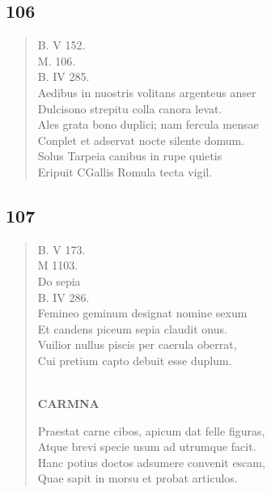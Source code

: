 \documentclass[11pt, a4paper]{report}
\begin{document}
            \subsection*{106}
      \begin{verse}
      B. V 152. \\ M. 106. \\ B. IV 285. \\ Aedibus in nuostris volitans argenteus anser \\ Dulcisono strepitu colla canora levat. \\ Ales grata bono duplici; nam fercula mensae \\ Conplet et adservat nocte silente domum. \\ Solus Tarpeia canibus in rupe quietis \\ Eripuit CGallis Romula tecta vigil. \\ 
      \end{verse}
  
            \subsection*{107}
      \begin{verse}
      B. V 173. \\ M 1103. \\ Do sepia \\ B. IV 286. \\ Femineo geminum designat nomine sexum \\ Et candens piceum sepia claudit onus. \\ Vuilior nullus piscis per caerula oberrat, \\ Cui pretium capto debuit esse duplum. \\ 
        ﻿\pagebreak 
    \begin{center} \textbf{CARMNA} \end{center} \marginpar{[128]} Praestat carne cibos, apicum dat felle figuras, \\ Atque brevi specie usum ad utrumque facit. \\ Hanc potius doctos adsumere convenit escam, \\ Quae sapit in morsu et probat articulos. \\ 
      \end{verse}
  
\end{document}
